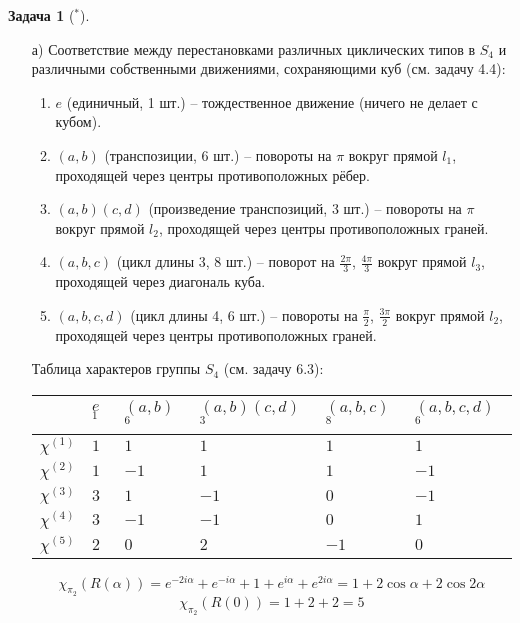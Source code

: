 \documentclass[12pt]{article}
\theoremstyle{definition}
\newtheorem{zad}{Задача}[section]
\begin{document}
\begin{zad}[$^*$]
\begin{itemize}
    \item[а)] Соответствие между перестановками различных циклических типов в $S_4$ и различными собственными движениями, сохраняющими куб (см. задачу 4.4):
    \begin{enumerate}
        \item $e$ (единичный, 1 шт.) -- тождественное движение (ничего не делает с кубом).
        \item $(a,b)$ (транспозиции, 6 шт.) -- повороты на $\pi$ вокруг прямой $l_1$, проходящей через центры противоположных рёбер.
        \item $(a,b)(c,d)$ (произведение транспозиций, 3 шт.) -- повороты на $\pi$ вокруг прямой $l_2$, проходящей через центры противоположных граней.
        \item $(a,b,c)$ (цикл длины 3, 8 шт.) -- поворот на $\frac{2\pi}{3}$, $\frac{4\pi}{3}$ вокруг прямой $l_3$, проходящей через диагональ куба.
        \item $(a,b,c,d)$ (цикл длины 4, 6 шт.) -- повороты на $\frac{\pi}{2}$, $\frac{3\pi}{2}$ вокруг прямой $l_2$, проходящей через центры противоположных граней.
    \end{enumerate}
    Таблица характеров группы $S_4$ (см. задачу 6.3):
    \begin{table}[h!]
    \centering
    \begin{tabular}{|l|l|l|l|l|l|}
    \hline
     & $e$ $^1$ & $(a,b)$ $^6$ & $(a,b)(c,d)$ $^3$ & $(a,b,c)$ $^8$ & $(a,b,c,d)$ $^6$ \\ \hline
    $\chi^{(1)}$ & $1$ & $1$ & $1$ & $1$ & $1$ \\ \hline
    $\chi^{(2)}$ & $1$ & $-1$ & $1$ & $1$ & $-1$ \\ \hline
    $\chi^{(3)}$ & $3$ & $1$ & $-1$ & $0$ & $-1$ \\ \hline
    $\chi^{(4)}$ & $3$ & $-1$ & $-1$ & $0$ & $1$ \\ \hline
    $\chi^{(5)}$ & $2$ &  $0$ & $2$ & $-1$ & $0$  \\ \hline
    \end{tabular}
    \end{table}
    \begin{equation}
        \chi_{\pi_2}(R(\alpha))=e^{-2i\alpha}+e^{-i\alpha}+1+e^{i\alpha}+e^{2i\alpha}=1+2\cos\alpha+2\cos 2\alpha
    \end{equation}
    \begin{equation}
        \chi_{\pi_2}(R(0))=1+2+2=5

\end{equation}
\end{itemize}
\end{zad}
\end{document}
